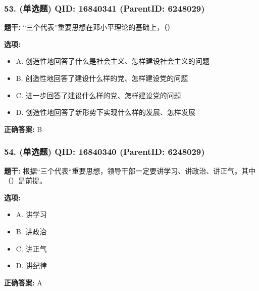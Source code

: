 \documentclass[12pt,UTF8]{ctexart}
\begin{document}
\subsubsection*{53. (单选题) \small QID: 16840341 (ParentID: 6248029)}

\textbf{题干:}
“三个代表”重要思想在邓小平理论的基础上，（）



\textbf{选项:}
\begin{itemize}[leftmargin=*]

  \item A. 创造性地回答了什么是社会主义、怎样建设社会主义的问题

  \item B. 创造性地回答了建设什么样的党、怎样建设党的问题

  \item C. 进一步回答了建设什么样的党、怎样建设党的问题

  \item D. 创造性地回答了新形势下实现什么样的发展、怎样发展

\end{itemize}

\textbf{正确答案:}
B

\vspace{0.3em}\hrulefill\vspace{0.7em}

\subsubsection*{54. (单选题) \small QID: 16840340 (ParentID: 6248029)}

\textbf{题干:}
根据“三个代表“重要思想，领导干部一定要讲学习、讲政治、讲正气。其中（）是前提。



\textbf{选项:}
\begin{itemize}[leftmargin=*]

  \item A. 讲学习

  \item B. 讲政治

  \item C. 讲正气

  \item D. 讲纪律

\end{itemize}

\textbf{正确答案:}
A

\vspace{0.3em}\hrulefill\vspace{0.7em}
\end{document}
